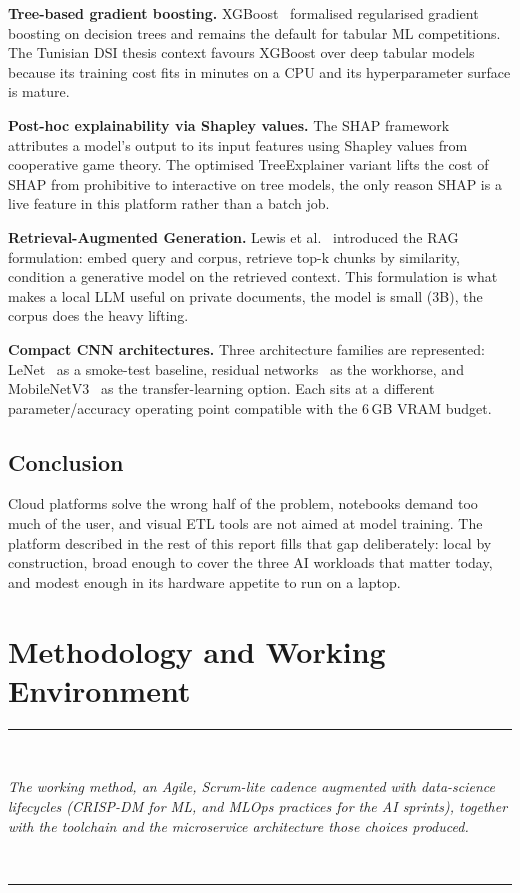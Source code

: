 \documentclass[12pt, a4paper, oneside]{report}
\newcommand{\chapterabstract}[1]{%
  \vspace*{1.2cm}%
  \begin{center}%
  \rule{0.45\textwidth}{0.4pt}\\[0.8em]%
  \begin{minipage}{0.82\textwidth}\centering\itshape\large #1\end{minipage}\\[0.8em]%
  \rule{0.45\textwidth}{0.4pt}%
  \end{center}%
  \vspace*{\fill}\clearpage}
\begin{document}
\textbf{Tree-based gradient boosting.} XGBoost~\cite{xgboost} formalised
regularised gradient boosting on decision trees and remains the
default for tabular ML competitions. The Tunisian DSI thesis context
favours XGBoost over deep tabular models because its training cost
fits in minutes on a CPU and its hyperparameter surface is mature.

\textbf{Post-hoc explainability via Shapley values.} The SHAP
framework~\cite{shap} attributes a model's output to its input
features using Shapley values from cooperative game theory. The
optimised TreeExplainer variant lifts the cost of SHAP from
prohibitive to interactive on tree models, the only reason SHAP is a
live feature in this platform rather than a batch job.

\textbf{Retrieval-Augmented Generation.} Lewis et al.~\cite{rag}
introduced the RAG formulation: embed query and corpus, retrieve top-k
chunks by similarity, condition a generative model on the retrieved
context. This formulation is what makes a local LLM useful on private
documents, the model is small (3B), the corpus does the heavy
lifting.

\textbf{Compact CNN architectures.} Three architecture families are
represented: LeNet~\cite{lenet} as a smoke-test baseline, residual
networks~\cite{resnet} as the workhorse, and
MobileNetV3~\cite{mobilenetv3} as the transfer-learning option. Each
sits at a different parameter/accuracy operating point compatible with
the 6\,GB VRAM budget.

\section*{Conclusion}

Cloud platforms solve the wrong half of the problem, notebooks demand
too much of the user, and visual ETL tools are not aimed at model
training. The platform described in the rest of this report fills
that gap deliberately: local by construction, broad enough to cover
the three AI workloads that matter today, and modest enough in its
hardware appetite to run on a laptop.

\chapter{Methodology and Working Environment}
\chapterabstract{The working method, an Agile, Scrum-lite cadence augmented with
data-science lifecycles (CRISP-DM for ML, and MLOps practices for the AI sprints), together with the toolchain and the microservice architecture those choices
produced.}
\end{document}
